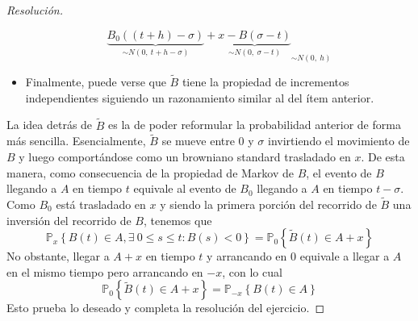 \documentclass[a4paper,11pt]{article}
\newcommand{\Probx}[2]{\ensuremath{\mathbb{P}_{#1} \left\{ #2 \right\}}}
\begin{document}
\begin{proof}[Resoluci\'on]
\begin{itemize}
$${            \underbrace{B_0((t+h) - \sigma)}_{\sim N(0,~t+h-\sigma)} 
            + \underbrace{x - B(\sigma - t)}_{\sim N(0,~\sigma - t)}}_{\sim N(0,~h)}$$
    \item Finalmente, puede verse que $\tilde{B}$ tiene la propiedad de incrementos independientes siguiendo
    un razonamiento similar al del ítem anterior.
\end{itemize}
La idea detrás de $\tilde{B}$ es la de poder reformular la probabilidad anterior de forma más sencilla. 
Esencialmente, $\tilde{B}$ se mueve entre $0$ y $\sigma$ invirtiendo el movimiento de $B$ y luego
comportándose como un browniano standard trasladado en $x$. De esta manera, como consecuencia de la
propiedad de Markov de $B$, el evento de $B$ llegando a $A$ en tiempo $t$ equivale al evento de $B_0$
llegando a $A$ en tiempo $t - \sigma$. Como $B_0$ está trasladado en $x$ y siendo la primera porción del
recorrido de $\tilde{B}$ una inversión del recorrido de $B$, tenemos que
$$\Probx{x}{B(t) \in A, \exists~0 \leq s \leq t : B(s) < 0} = \Probx{0}{\tilde{B}(t) \in A + x}$$
No obstante, llegar a $A+x$ en tiempo $t$ y arrancando en $0$ equivale a llegar a $A$ en el mismo tiempo
pero arrancando en $-x$, con lo cual
$$\Probx{0}{\tilde{B}(t) \in A + x} = \Probx{-x}{B(t) \in A}$$
Esto prueba lo deseado y completa la resolución del ejercicio.

\end{proof}
\end{document}
